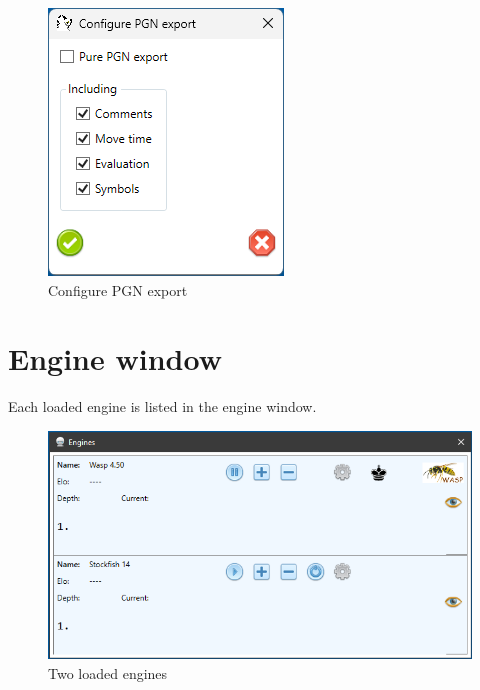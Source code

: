 \documentclass[11pt,a4paper]{article}
\begin{document}
\begin{figure}[H]
	\centering
	\includegraphics[scale=0.8]{Games9.png}
	\caption{Configure PGN export}
	\label{fig:Games9}
\end{figure}

\section{Engine window}

Each loaded engine is listed in the engine window.

\begin{figure}[H]
	\centering
	\includegraphics[scale=0.8]{EngineWindow1.png}
	\caption{Two loaded engines}
	\label{fig:EngineWindow1}
\end{figure}
\end{document}
